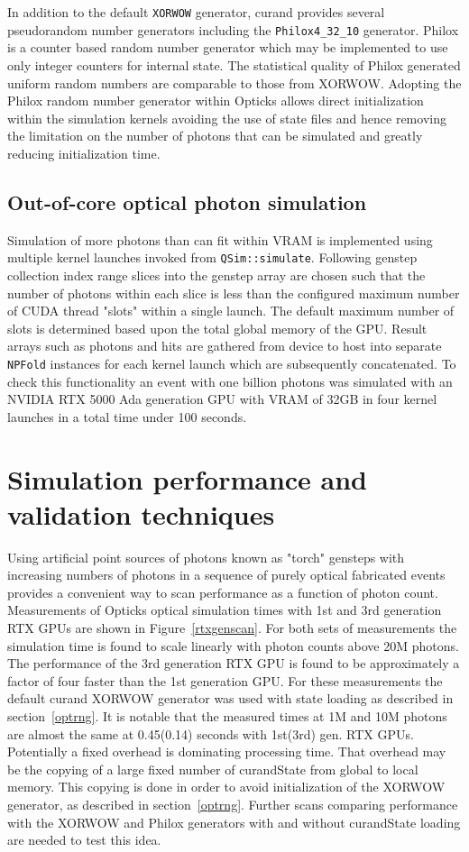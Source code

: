 \documentclass{webofc}
\begin{document}
In addition to the default {\tt XORWOW} generator, curand provides several 
pseudorandom number generators including the {\tt Philox4\_32\_10} generator.
Philox is a counter based random number generator which may be implemented to 
use only integer counters for internal state. 
The statistical quality of Philox generated uniform random numbers are comparable 
to those from XORWOW\cite{curand}.
Adopting the Philox random number generator within Opticks allows direct initialization within
the simulation kernels avoiding the use of state files and hence removing the 
limitation on the number of photons that can be simulated and greatly reducing 
initialization time. 
%
\subsection{Out-of-core optical photon simulation}
%
Simulation of more photons than can fit within VRAM is implemented
using multiple kernel launches invoked from {\tt QSim::simulate}. 
Following genstep collection index range slices into the genstep array 
are chosen such that the number of photons within each slice is less than 
the configured maximum number of CUDA thread "slots" within a single launch.
The default maximum number of slots is determined based upon the total
global memory of the GPU. Result arrays such as photons and hits are gathered
from device to host into separate {\tt NPFold} instances for each kernel launch 
which are subsequently concatenated. To check this functionality 
an event with one billion photons was simulated with an NVIDIA RTX 5000 Ada 
generation GPU with VRAM of 32GB in four kernel launches 
in a total time under 100 seconds. 
%
\section{Simulation performance and validation techniques}
%
Using artificial point sources of photons known as "torch" gensteps with increasing numbers of photons in a sequence of 
purely optical fabricated events provides a convenient way to scan performance as 
a function of photon count. Measurements of Opticks optical simulation times with 1st and 3rd generation 
RTX GPUs are shown in Figure~\ref{rtxgenscan}.
For both sets of measurements the simulation time is found to scale linearly with photon counts
above 20M photons. The performance of the 3rd generation RTX GPU is found to be approximately a factor of four faster 
than the 1st generation GPU. For these measurements the default curand XORWOW generator 
was used with state loading as described in section~\ref{optrng}.  
%
It is notable that the measured times at 1M and 10M photons are almost the same at 0.45(0.14) 
seconds with 1st(3rd) gen. RTX GPUs. Potentially a fixed overhead is dominating processing time. 
That overhead may be the copying of a large fixed number of curandState 
from global to local memory. This copying is done in order to avoid 
initialization of the XORWOW generator, as described in section~\ref{optrng}.
Further scans comparing performance with the XORWOW and Philox generators
with and without curandState loading are needed to test this idea.  
\end{document}

